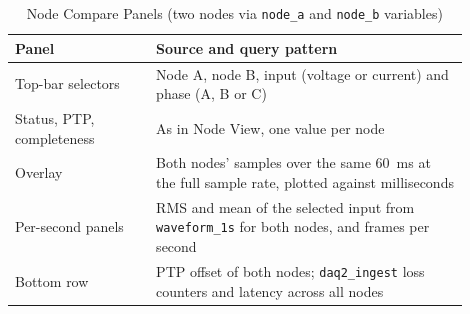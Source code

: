 \begin{table}[H]
  \caption{Node Compare Panels (two nodes via \texttt{node\_a} and \texttt{node\_b} variables)}
  \label{tab:nodecompare}
  \begin{center}
    \begin{tabular}{p{0.28\linewidth}p{0.62\linewidth}}
      \hline
      \textbf{Panel} & \textbf{Source and query pattern}\\
      \hline
      Top-bar selectors & Node A, node B, input (voltage or current) and phase (A, B or C) \\
      Status, PTP, completeness & As in Node View, one value per node \\
      Overlay & Both nodes' samples over the same 60~ms at the full sample rate, plotted against milliseconds \\
      Per-second panels & RMS and mean of the selected input from \texttt{waveform\_1s} for both nodes, and frames per second \\
      Bottom row & PTP offset of both nodes; \texttt{daq2\_ingest} loss counters and latency across all nodes \\
      \hline
    \end{tabular}
  \end{center}
\end{table}
